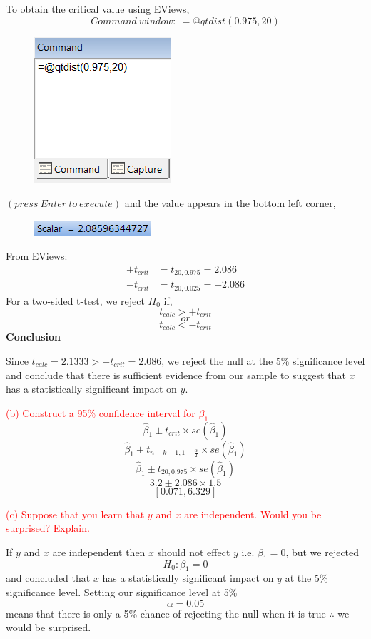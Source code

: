 \documentclass[12pt]{report}
\begin{document}
\noindent To obtain the critical value using EViews,
$$Command\ window:\ =@qtdist(0.975,20)$$
\begin{figure}[H]
	\centering
	\includegraphics{tute6_q1_5}
\end{figure}
\vspace{-\baselineskip}\centering $(press\ Enter\ to\ execute)$
\justify and the value appears in the bottom left corner,
\begin{figure}[H]
	\centering
	\includegraphics{tute6_q1_6}
\end{figure}
\vspace{-\baselineskip}
\noindent From EViews: \begin{align*}
+t_{crit} &= t_{20,0.975} = 2.086 \\
-t_{crit} &= t_{20,0.025} = -2.086
\end{align*}
\noindent For a two-sided t-test, we reject $H_0$ if,
$$t_{calc} > +t_{crit}$$
$$or$$
$$t_{calc} < -t_{crit}$$
\noindent \textbf{Conclusion}

\noindent Since $t_{calc} = 2.1333 > +t_{crit} = 2.086$, we reject the null at the 5\% significance level and conclude that there is sufficient evidence from our sample to suggest that $x$ has a statistically significant impact on $y$.

\newpage
\noindent \textcolor{red}{(b) Construct a 95\% confidence interval for $\beta_1$}
$$\hat{\beta}_1 \pm t_{crit} \times se(\hat{\beta}_1)$$
$$\hat{\beta}_1 \pm t_{n-k-1,1-\frac{\alpha}{2}} \times se(\hat{\beta}_1)$$
$$\hat{\beta}_1 \pm t_{20,0.975} \times se(\hat{\beta}_1)$$
$$3.2 \pm 2.086 \times 1.5$$
$$[0.071,6.329]$$

\noindent \textcolor{red}{(c) Suppose that you learn that $y$ and $x$ are independent. Would you be surprised? Explain.}

\noindent If $y$ and $x$ are independent then $x$ should not effect $y$ i.e. $\beta_1 = 0$, but we rejected $$H_0: \beta_1 = 0$$ and concluded that $x$ has a statistically significant impact on $y$ at the 5\% significance level. Setting our significance level at 5\% $$\alpha=0.05$$ means that there is only a 5\% chance of rejecting the null when it is true $\therefore$ we would be surprised.
\end{document}
